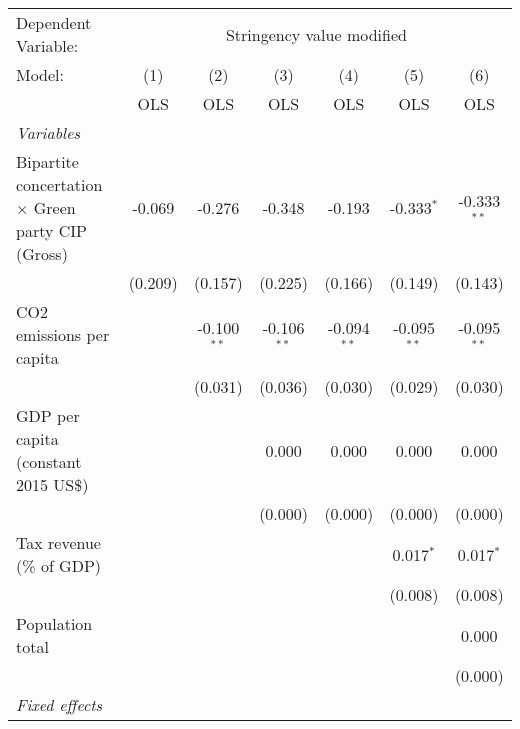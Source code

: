 
\begingroup
\centering
\begin{tabular}{lcccccc}
   \toprule
   Dependent Variable: & \multicolumn{6}{c}{Stringency value modified}\\
   Model:                                                   & (1)     & (2)           & (3)           & (4)           & (5)           & (6)\\  
                                                            &  OLS    & OLS           & OLS           & OLS           & OLS           & OLS\\  
   \midrule
   \emph{Variables}\\
   Bipartite concertation $\times$ Green party CIP (Gross)  & -0.069  & -0.276        & -0.348        & -0.193        & -0.333$^{*}$  & -0.333$^{**}$\\   
                                                            & (0.209) & (0.157)       & (0.225)       & (0.166)       & (0.149)       & (0.143)\\   
   CO2 emissions per capita                                 &         & -0.100$^{**}$ & -0.106$^{**}$ & -0.094$^{**}$ & -0.095$^{**}$ & -0.095$^{**}$\\   
                                                            &         & (0.031)       & (0.036)       & (0.030)       & (0.029)       & (0.030)\\   
   GDP per capita (constant 2015 US\$)                      &         &               & 0.000         & 0.000         & 0.000         & 0.000\\   
                                                            &         &               & (0.000)       & (0.000)       & (0.000)       & (0.000)\\   
   Tax revenue (\% of GDP)                                  &         &               &               &               & 0.017$^{*}$   & 0.017$^{*}$\\   
                                                            &         &               &               &               & (0.008)       & (0.008)\\   
   Population total                                         &         &               &               &               &               & 0.000\\   
                                                            &         &               &               &               &               & (0.000)\\   
   \emph{Fixed effects}\\

\end{tabular}

